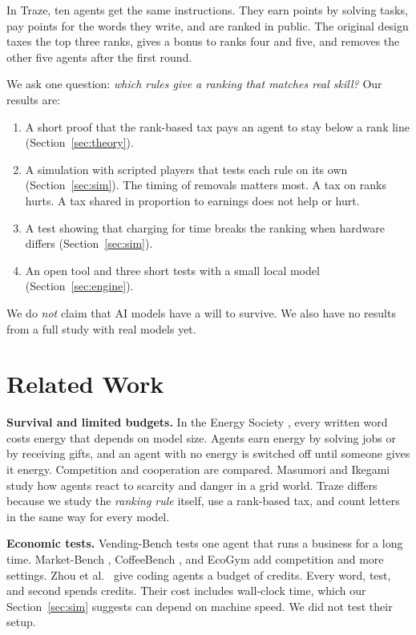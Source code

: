 \documentclass[conference]{IEEEtran}
\theoremstyle{plain}
\begin{document}
In Traze, ten agents get the same instructions. They earn points by solving tasks, pay points for the words they write, and are ranked in public. The original design taxes the top three ranks, gives a bonus to ranks four and five, and removes the other five agents after the first round.

We ask one question: \emph{which rules give a ranking that matches real skill?} Our results are:
\begin{enumerate}
\item A short proof that the rank-based tax pays an agent to stay below a rank line (Section~\ref{sec:theory}).
\item A simulation with scripted players that tests each rule on its own (Section~\ref{sec:sim}). The timing of removals matters most. A tax on ranks hurts. A tax shared in proportion to earnings does not help or hurt.
\item A test showing that charging for time breaks the ranking when hardware differs (Section~\ref{sec:sim}).
\item An open tool and three short tests with a small local model (Section~\ref{sec:engine}).
\end{enumerate}
We do \emph{not} claim that AI models have a will to survive. We also have no results from a full study with real models yet.

\section{Related Work}
\textbf{Survival and limited budgets.} In the Energy Society \cite{hansen2026energy}, every written word costs energy that depends on model size. Agents earn energy by solving jobs or by receiving gifts, and an agent with no energy is switched off until someone gives it energy. Competition and cooperation are compared. Masumori and Ikegami \cite{masumori2025survival} study how agents react to scarcity and danger in a grid world. Traze differs because we study the \emph{ranking rule} itself, use a rank-based tax, and count letters in the same way for every model.

\textbf{Economic tests.} Vending-Bench \cite{backlund2025vendingbench} tests one agent that runs a business for a long time. Market-Bench \cite{zheng2026marketbench}, CoffeeBench \cite{sugiura2026coffeebench}, and EcoGym \cite{hu2026ecogym} add competition and more settings. Zhou et al.\ \cite{zhou2026credit} give coding agents a budget of credits. Every word, test, and second spends credits. Their cost includes wall-clock time, which our Section~\ref{sec:sim} suggests can depend on machine speed. We did not test their setup.
\end{document}
